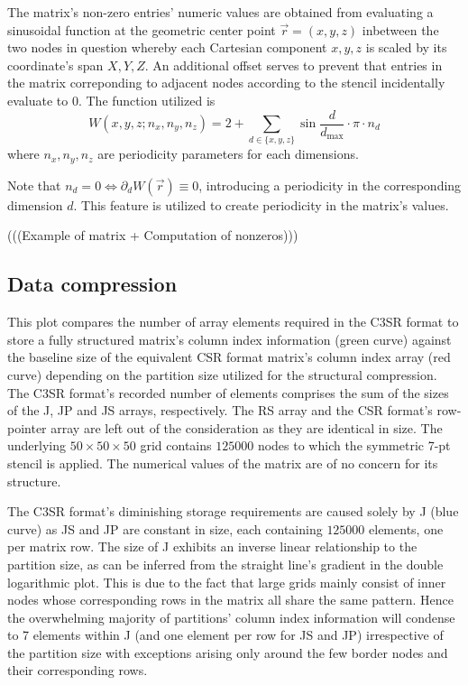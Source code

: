 \documentclass{article}
\begin{document}
    The matrix's non-zero entries' numeric values are obtained from evaluating a sinusoidal function at the geometric
    center point $\vec{r} = (x, y, z)$ inbetween the two nodes in question whereby each Cartesian component $x, y, z$ is
    scaled by its coordinate's span $X, Y, Z$. An additional offset serves to prevent that entries in the matrix
    correponding to adjacent nodes according to the stencil incidentally evaluate to 0. The function utilized is
    $$W(x,y,z; n_x, n_y, n_z) = 2 + \sum \limits_{d \in \{x,y,z\}} \sin{\frac{d}{d_{\text{max}}} \cdot \pi \cdot n_d} $$
    where $n_x, n_y, n_z$ are periodicity parameters for each dimensions.

    Note that $n_d = 0 \Leftrightarrow \partial_d W(\vec{r}) \equiv 0$, introducing a periodicity in the corresponding
    dimension $d$. This feature is utilized to create periodicity in the matrix's values.

    (((Example of matrix + Computation of nonzeros)))

  \subsection{Data compression}

    This plot compares the number of array elements required in the C3SR format to store a fully structured matrix's column index information (green curve) against the baseline size of the equivalent CSR format matrix's column index array (red curve) depending on the partition size utilized for the structural compression. The C3SR format's recorded number of elements comprises the sum of the sizes of the J, JP and JS arrays, respectively. The RS array and the CSR format's row-pointer array are left out of the consideration as they are identical in size. The underlying $50 \times 50 \times 50$ grid contains $125000$ nodes to which the symmetric 7-pt stencil is applied. The numerical values of the matrix are of no concern for its structure.

    The C3SR format's diminishing storage requirements are caused solely by J (blue curve) as JS and
    JP are constant in size, each containing $125000$ elements, one per matrix row. The size of J
    exhibits an inverse linear relationship to the partition size, as can be inferred from the
    straight line's gradient in the double logarithmic plot. This is due to the fact that large
    grids mainly consist of inner nodes whose corresponding rows in the matrix all share the same pattern. Hence the overwhelming majority of partitions' column index information will condense to 7 elements within J (and one element per row for JS and JP) irrespective of the partition size with exceptions arising only around the few border nodes and their corresponding rows.
\end{document}
